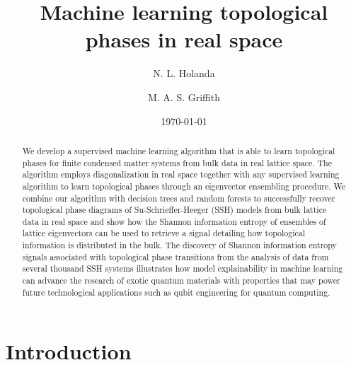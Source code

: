 \documentclass[10pt]{revtex4-1}
\begin{document}
\nocite{*}

\title{Machine learning topological phases in real space}

\author{N. L. Holanda}

\author{M. A. S. Griffith}

\date{\today }

\begin{abstract}
We develop a supervised machine learning algorithm that is able to learn topological phases for finite condensed matter systems from bulk data in real lattice space. The algorithm employs diagonalization in real space together with any supervised learning algorithm to learn topological phases through an eigenvector ensembling procedure. We combine our algorithm with decision trees and random forests to successfully recover topological phase diagrams of Su-Schrieffer-Heeger (SSH) models from bulk lattice data in real space and show how the Shannon information entropy of ensembles of lattice eigenvectors can be used to retrieve a signal detailing how topological information is distributed in the bulk. The discovery of Shannon information entropy signals associated with topological phase transitions from the analysis of data from several thousand SSH systems illustrates how model explainability in machine learning can advance the research of exotic quantum materials with properties that may power future technological applications such as qubit engineering for quantum computing. 
\end{abstract}

\maketitle

\section*{Introduction}
\end{document}
